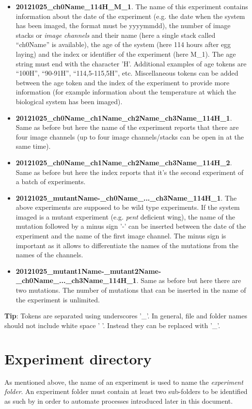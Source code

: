 \begin{itemize}
 \item \textbf{20121025\_ch0Name\_114H\_M\_1}. The name of this experiment contains information about the date of the experiment (e.g. the date when the system has been imaged, the format must be yyyymmdd), the number of image stacks or \textit{image channels} and their name (here a single stack called ``ch0Name'' is available), the age of the system (here 114 hours after egg laying) and the index or identifier of the experiment (here M\_1). The age string must end with the character 'H'. Additional examples of age tokens are ``100H'', ``90-91H'', ``114,5-115,5H'', etc. Miscellaneous tokens can be added between the age token and the index of the experiment to provide more information (for example information about the temperature at which the biological system has been imaged).
 \item \textbf{20121025\_ch0Name\_ch1Name\_ch2Name\_ch3Name\_114H\_1}. Same as before but here the name of the experiment reports that there are four image channels (up to four image channels/stacks can be open in \wingj at the same time).
 \item \textbf{20121025\_ch0Name\_ch1Name\_ch2Name\_ch3Name\_114H\_2}. Same as before but here the index reports that it's the second experiment of a batch of experiments.
 \item \textbf{20121025\_mutantName-\_ch0Name\_...\_ch3Name\_114H\-\_1}. The above experiments are supposed to be wild type experiments. If the system imaged is a mutant experiment (e.g. \textit{pent} deficient \droso wing), the name of the mutation followed by a minus sign '-' can be inserted between the date of the experiment and the name of the first image channel. The minus sign is important as it allows \wingj to differentiate the names of the mutations from the names of the channels.
 \item \textbf{20121025\_mutant1Name-\_mutant2Name-\_ch0\-Name\_...\_ch3\-Name\_114H\_1}. Same as before but here there are two mutations. The number of mutations that can be inserted in the name of the experiment is unlimited.
\end{itemize}

\textbf{Tip}: Tokens are separated using underscores '\_'. In general, file and folder names should not include white space ' '. Instead they can be replaced with '\_'.

\section{Experiment directory}\label{sec:experiment_directory}
As mentioned above, the name of an experiment is used to name the \textit{experiment folder}. An experiment folder must contain at least two sub-folders to be identified as such by \wingj in order to automate processes introduced later in this document.

